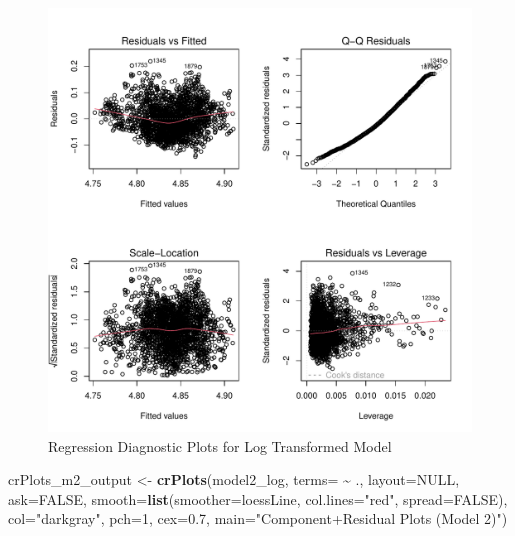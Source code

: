 \documentclass[
]{article}
\newenvironment{Shaded}{\begin{snugshade}}{\end{snugshade}}
\newcommand{\AttributeTok}[1]{\textcolor[rgb]{0.13,0.29,0.53}{#1}}
\newcommand{\ConstantTok}[1]{\textcolor[rgb]{0.56,0.35,0.01}{#1}}
\newcommand{\DecValTok}[1]{\textcolor[rgb]{0.00,0.00,0.81}{#1}}
\newcommand{\FloatTok}[1]{\textcolor[rgb]{0.00,0.00,0.81}{#1}}
\newcommand{\FunctionTok}[1]{\textcolor[rgb]{0.13,0.29,0.53}{\textbf{#1}}}
\newcommand{\NormalTok}[1]{#1}
\newcommand{\OtherTok}[1]{\textcolor[rgb]{0.56,0.35,0.01}{#1}}
\newcommand{\SpecialCharTok}[1]{\textcolor[rgb]{0.81,0.36,0.00}{\textbf{#1}}}
\newcommand{\StringTok}[1]{\textcolor[rgb]{0.31,0.60,0.02}{#1}}
\begin{document}
\begin{figure}
\centering
\includegraphics{FinalProject_files/figure-latex/model2-diagnostics-1.pdf}
\caption{Regression Diagnostic Plots for Log Transformed Model}
\end{figure}

\begin{Shaded}
\begin{Highlighting}[]
\NormalTok{    crPlots\_m2\_output }\OtherTok{\textless{}{-}} \FunctionTok{crPlots}\NormalTok{(model2\_log,}
                                 \AttributeTok{terms=} \SpecialCharTok{\textasciitilde{}}\NormalTok{ .,}
                                 \AttributeTok{layout=}\ConstantTok{NULL}\NormalTok{,}
                                 \AttributeTok{ask=}\ConstantTok{FALSE}\NormalTok{,}
                                 \AttributeTok{smooth=}\FunctionTok{list}\NormalTok{(}\AttributeTok{smoother=}\NormalTok{loessLine,}
                                             \AttributeTok{col.lines=}\StringTok{"red"}\NormalTok{,}
                                             \AttributeTok{spread=}\ConstantTok{FALSE}\NormalTok{),}
                                 \AttributeTok{col=}\StringTok{"darkgray"}\NormalTok{,}
                                 \AttributeTok{pch=}\DecValTok{1}\NormalTok{,}
                                 \AttributeTok{cex=}\FloatTok{0.7}\NormalTok{,}
                                 \AttributeTok{main=}\StringTok{"Component+Residual Plots (Model 2)"}\NormalTok{)}
\end{Highlighting}
\end{Shaded}
\end{document}
